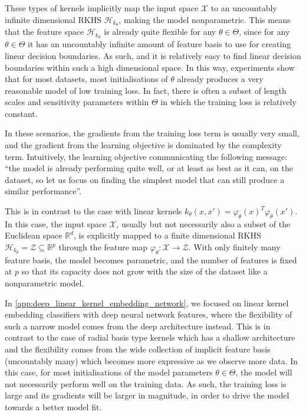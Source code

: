 \documentclass{article}
\begin{document}
		These types of kernels implicitly map the input space $\mathcal{X}$ to an uncountably infinite dimensional RKHS $\mathcal{H}_{k_{\theta}}$, making the model nonparametric. This means that the feature space $\mathcal{H}_{k_{\theta}}$ is already quite flexible for any $\theta \in \Theta$, since for any $\theta \in \Theta$ it has an uncountably infinite amount of feature basis to use for creating linear decision boundaries. As such, and it is relatively easy to find linear decision boundaries within such a high dimensional space. In this way, experiments show that for most datasets, most initialisations of $\theta$ already produces a very reasonable model of low training loss. In fact, there is often a subset of length scales and sensitivity parameters within $\Theta$ in which the training loss is relatively constant.
		
		In these scenarios, the gradients from the training loss term is usually very small, and the gradient from the learning objective is dominated by the complexity term. Intuitively, the learning objective communicating the following message: ``the model is already performing quite well, or at least as best as it can, on the dataset, so let us focus on finding the simplest model that can still produce a similar performance''.
		
		This is in contrast to the case with linear kernels $k_{\theta}(x, x') = \varphi_{\theta}(x)^{T} \varphi_{\theta}(x')$. In this case, the input space $\mathcal{X}$, usually but not necessarily also a subset of the Euclidean space $\mathbb{R}^{d}$, is explicitly mapped to a finite dimensional RKHS $\mathcal{H}_{k_{\theta}} = \mathcal{Z} \subseteq \mathbb{R}^{p}$ through the feature map $\varphi_{\theta} : \mathcal{X} \to \mathcal{Z}$. With only finitely many feature basis, the model becomes parametric, and the number of features is fixed at $p$ so that its capacity does not grow with the size of the dataset like a nonparametric model.
		
		In \cref{app:deep_linear_kernel_embedding_network}, we focused on linear kernel embedding classifiers with deep neural network features, where the flexibility of such a narrow model comes from the deep architecture instead. This is in contrast to the case of radial basis type kernels which has a shallow architecture and the flexibility comes from the wide collection of implicit feature basis (uncountably many) which becomes more expressive as we observe more data. In this case, for most initialisations of the model parameters $\theta \in \Theta$, the model will not necessarily perform well on the training data. As such, the training loss is large and its gradients will be larger in magnitude, in order to drive the model towards a better model fit.
		
\end{document}
